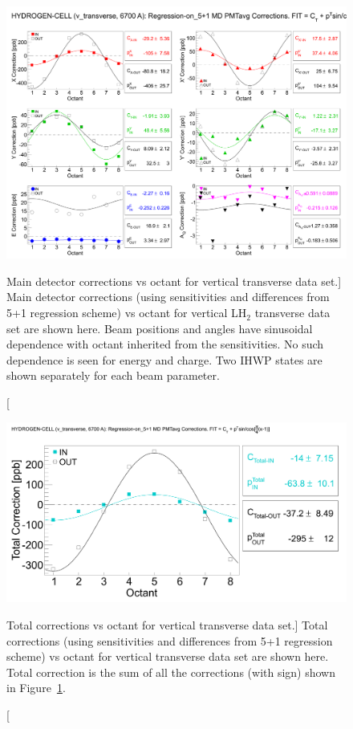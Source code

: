\begin{figure}[!h]
	\begin{center}
	\includegraphics[width=15.0cm]{figures/MD_v_transverse_5+1_corrections}
	\end{center}
	\caption
	[Main detector corrections vs octant for vertical transverse data set.]	
	{Main detector corrections (using sensitivities and differences from 5+1 regression scheme) vs octant for vertical LH$_{2}$ transverse data set are shown here. Beam positions and angles have sinusoidal dependence with octant inherited from the sensitivities. No such dependence is seen for energy and charge. Two IHWP states are shown separately for each beam parameter.}
	\label{fig:MD_v_transverse_5+1_corrections}
\end{figure}

\begin{figure}[!h]
	\begin{center}
	\includegraphics[width=15.0cm]{figures/MD_v_transverse_5+1_TotalCorrections}
	\end{center}
	\caption
	[Total corrections vs octant for vertical transverse data set.]	
	{Total corrections (using sensitivities and differences from 5+1 regression scheme) vs octant for vertical transverse data set are shown here. Total correction is the sum of all the corrections (with sign) shown in Figure~\ref{fig:MD_v_transverse_5+1_corrections}.}
	\label{fig:MD_v_transverse_5+1_TotalCorrections}
\end{figure}



